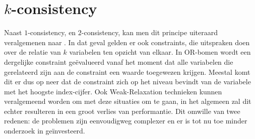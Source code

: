 \section{$k$-consistency}
Naast $1$-consistency, en $2$-consistency, kan men dit principe uiteraard veralgemenen naar . In dat geval gelden er ook constraints, die uitspraken doen over de relatie van $k$ variabelen ten opzicht van elkaar. In OR-bomen wordt een dergelijke constraint ge\"evalueerd vanaf het moment dat alle variabelen die gerelateerd zijn aan de constraint een waarde toegewezen krijgen. Meestal komt dit er dus op neer dat de constraint zich op het niveau bevindt van de variabele met het hoogste index-cijfer. Ook Weak-Relaxation technieken kunnen veralgemeend worden om met deze situaties om te gaan, in het algemeen zal dit echter resulteren in een groot verlies van performantie. Dit omwille van twee redenen: de problemen zijn eenvoudigweg complexer en er is tot nu toe minder onderzoek in ge\"investeerd.
